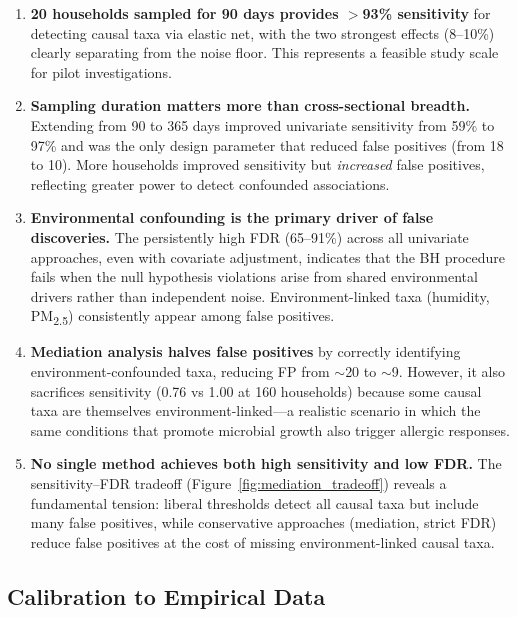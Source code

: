 \documentclass[11pt,letterpaper]{article}
\begin{document}
\begin{enumerate}
    \item \textbf{20 households sampled for 90 days provides $>$93\% sensitivity} for detecting causal taxa via elastic net, with the two strongest effects (8--10\%) clearly separating from the noise floor. This represents a feasible study scale for pilot investigations.

    \item \textbf{Sampling duration matters more than cross-sectional breadth.} Extending from 90 to 365 days improved univariate sensitivity from 59\% to 97\% and was the only design parameter that reduced false positives (from 18 to 10). More households improved sensitivity but \emph{increased} false positives, reflecting greater power to detect confounded associations.

    \item \textbf{Environmental confounding is the primary driver of false discoveries.} The persistently high FDR (65--91\%) across all univariate approaches, even with covariate adjustment, indicates that the BH procedure fails when the null hypothesis violations arise from shared environmental drivers rather than independent noise. Environment-linked taxa (humidity, PM\textsubscript{2.5}) consistently appear among false positives.

    \item \textbf{Mediation analysis halves false positives} by correctly identifying environment-confounded taxa, reducing FP from $\sim$20 to $\sim$9. However, it also sacrifices sensitivity (0.76 vs 1.00 at 160 households) because some causal taxa are themselves environment-linked---a realistic scenario in which the same conditions that promote microbial growth also trigger allergic responses.

    \item \textbf{No single method achieves both high sensitivity and low FDR.} The sensitivity--FDR tradeoff (Figure~\ref{fig:mediation_tradeoff}) reveals a fundamental tension: liberal thresholds detect all causal taxa but include many false positives, while conservative approaches (mediation, strict FDR) reduce false positives at the cost of missing environment-linked causal taxa.
\end{enumerate}

\subsection{Calibration to Empirical Data}
\end{document}

